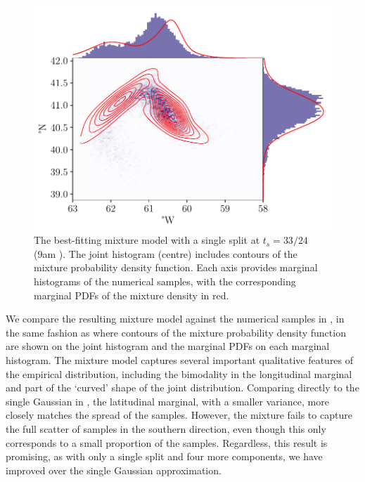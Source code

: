 \begin{figure}
	\centering
	\includegraphics[width=\textwidth]{chp06_applications/figures/gulf_stream/gmm_split_best}
	\caption{The best-fitting mixture model with a single split at \(t_s = 33/24\) (9am ).
		The joint histogram (centre) includes contours of the mixture probability density function.
		Each axis provides marginal histograms of the numerical samples, with the corresponding marginal PDFs of the mixture density in red.}
	\label{fig:na_1split_best}
\end{figure}


We compare the resulting mixture model against the numerical samples in , in the same fashion as  where contours of the mixture probability density function are shown on the joint histogram and the marginal PDFs on each marginal histogram.
The mixture model captures several important qualitative features of the empirical distribution, including the bimodality in the longitudinal marginal and part of the `curved' shape of the joint distribution.
Comparing directly to the single Gaussian in , the latitudinal marginal, with a smaller variance, more closely matches the spread of the samples.
However, the mixture fails to capture the full scatter of samples in the southern direction, even though this only corresponds to a small proportion of the samples.
Regardless, this result is promising, as with only a single split and four more components, we have improved over the single Gaussian approximation.

